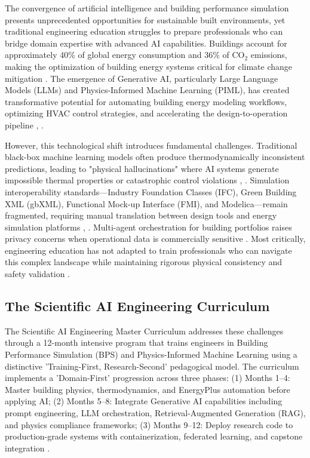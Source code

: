 \documentclass[12pt,a4paper]{article}
\begin{document}
The convergence of artificial intelligence and building performance simulation presents unprecedented opportunities for sustainable built environments, yet traditional engineering education struggles to prepare professionals who can bridge domain expertise with advanced AI capabilities. Buildings account for approximately 40\% of global energy consumption and 36\% of CO$_2$ emissions, making the optimization of building energy systems critical for climate change mitigation \cite{ref1}. The emergence of Generative AI, particularly Large Language Models (LLMs) and Physics-Informed Machine Learning (PIML), has created transformative potential for automating building energy modeling workflows, optimizing HVAC control strategies, and accelerating the design-to-operation pipeline \cite{ref2}, \cite{ref3}.

However, this technological shift introduces fundamental challenges. Traditional black-box machine learning models often produce thermodynamically inconsistent predictions, leading to "physical hallucinations" where AI systems generate impossible thermal properties or catastrophic control violations \cite{ref4}, \cite{ref5}. Simulation interoperability standards---Industry Foundation Classes (IFC), Green Building XML (gbXML), Functional Mock-up Interface (FMI), and Modelica---remain fragmented, requiring manual translation between design tools and energy simulation platforms \cite{ref6}, \cite{ref7}. Multi-agent orchestration for building portfolios raises privacy concerns when operational data is commercially sensitive \cite{ref8}. Most critically, engineering education has not adapted to train professionals who can navigate this complex landscape while maintaining rigorous physical consistency and safety validation \cite{ref9}.

\subsection{The Scientific AI Engineering Curriculum}

The Scientific AI Engineering Master Curriculum addresses these challenges through a 12-month intensive program that trains engineers in Building Performance Simulation (BPS) and Physics-Informed Machine Learning using a distinctive 'Training-First, Research-Second' pedagogical model. The curriculum implements a 'Domain-First' progression across three phases: (1) Months 1--4: Master building physics, thermodynamics, and EnergyPlus automation before applying AI; (2) Months 5--8: Integrate Generative AI capabilities including prompt engineering, LLM orchestration, Retrieval-Augmented Generation (RAG), and physics compliance frameworks; (3) Months 9--12: Deploy research code to production-grade systems with containerization, federated learning, and capstone integration \cite{ref10}.
\end{document}
